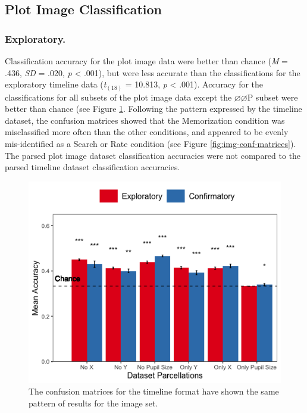 \documentclass[
  english,
  man,floatsintext]{apa6}
\begin{document}
\subsection{Plot Image Classification}
\subsubsection{Exploratory.}

Classification accuracy for the plot image data were better than chance (\emph{M} = .436, \emph{SD} = .020, \emph{p} \textless{} .001), but were less accurate than the classifications for the exploratory timeline data (\emph{t}\(_{(18)}\) = 10.813, \emph{p} \textless{} .001). Accuracy for the classifications for all subsets of the plot image data except the \(\varnothing\varnothing\)P subset were better than chance (see Figure \ref{fig:img-parcellation-chance}. Following the pattern expressed by the timeline dataset, the confusion matrices showed that the Memorization condition was misclassified more often than the other conditions, and appeared to be evenly mis-identified as a Search or Rate condition (see Figure \ref{fig:img-conf-matrices}). The parsed plot image dataset classification accuracies were not compared to the parsed timeline dataset classification accuracies.

\begin{figure}
\centering
\includegraphics{results/r_code/img_parcellation_chance.png}
\caption{\label{fig:img-parcellation-chance}The confusion matrices for the timeline format have shown the same pattern of results for the image set.}
\end{figure}
\end{document}
